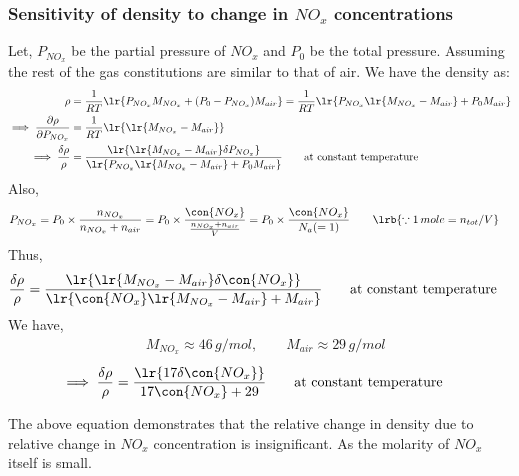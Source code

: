\subsubsection{Sensitivity of density to change in $NO_x$ concentrations}
Let, $P_{NO_x}$ be the partial pressure of $NO_x$ and $P_0$ be the total pressure. Assuming the rest of the gas constitutions are similar to that of air. We have the density as:
\begin{align*}
    \rho &= \frac{1}{RT} \lr{ P_{NO_x} M_{NO_x} + (P_0 - P_{NO_x}) M_{air}} = \frac{1}{RT} \lr{ P_{NO_x} \lr{M_{NO_x} - M_{air}} + P_0 M_{air}}\\
    \implies \frac{\partial \rho}{\partial P_{NO_x}} &= \frac{1}{RT} \lr{\lr{M_{NO_x} - M_{air}}}\\
    \implies \frac{\delta \rho}{\rho} &= \frac{\lr{\lr{M_{NO_x} - M_{air}} \delta P_{NO_x}}}{\lr{ P_{NO_x} \lr{M_{NO_x} - M_{air}} + P_0 M_{air}}} \qquad \text{at constant temperature}
\end{align*}
Also,
\begin{align*}
    P_{NO_x} &= P_0 \times \frac{n_{NO_x}}{n_{NO_x} + n_{air}} = P_0 \times \frac{\con{NO_x}}{\frac{n_{NO_x} + n_{air}}{V}} = P_0 \times \frac{\con{NO_x}}{N_a (=1)} \qquad \lrb{\because 1 \, mole = n_{tot}/V}
\end{align*}
Thus,
\begin{align*}
    \frac{\delta \rho}{\rho} &= \frac{\lr{\lr{M_{NO_x} - M_{air}} \delta \con{NO_x}}}{\lr{ \con{NO_x}
 \lr{M_{NO_x} - M_{air}} + M_{air}}}
    \qquad \text{at constant temperature}
\end{align*}
We have,
\begin{align*}
    &M_{NO_x} \approx 46 \, g/mol, \qquad M_{air} \approx 29 \, g/mol
\end{align*}
\begin{align*}
    \implies \frac{\delta \rho}{\rho} &= \frac{\lr{ 17 \delta \con{NO_x}}}{17 \con{NO_x} + 29}
    \qquad \text{at constant temperature}
\end{align*}

The above equation demonstrates that the relative change in density due to relative change in $NO_x$ concentration is insignificant. As the molarity of $NO_x$ itself is small.
